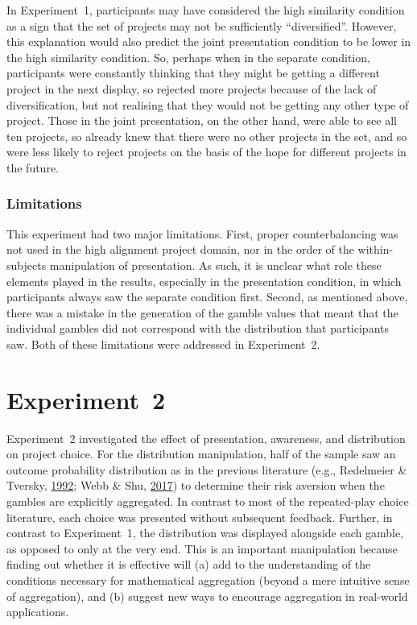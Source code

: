 \documentclass[
  english,
  man, donotrepeattitle,floatsintext]{apa7}
\theoremstyle{definition}
\theoremstyle{definition}
\theoremstyle{definition}
\theoremstyle{definition}
\theoremstyle{remark}
\begin{document}
In Experiment~1, participants may have considered the high similarity condition
as a sign that the set of projects may not be sufficiently ``diversified''.
However, this explanation would also predict the joint presentation condition to
be lower in the high similarity condition. So, perhaps when in the separate
condition, participants were constantly thinking that they might be getting a
different project in the next display, so rejected more projects because of the
lack of diversification, but not realising that they would not be getting any
other type of project. Those in the joint presentation, on the other hand, were
able to see all ten projects, so already knew that there were no other projects
in the set, and so were less likely to reject projects on the basis of the hope
for different projects in the future.

\hypertarget{limitations}{%
\subsubsection{Limitations}\label{limitations}}

This experiment had two major limitations. First, proper counterbalancing was
not used in the high alignment project domain, nor in the order of the
within-subjects manipulation of presentation. As such, it is unclear what role
these elements played in the results, especially in the presentation condition,
in which participants always saw the separate condition first. Second, as
mentioned above, there was a mistake in the generation of the gamble values that
meant that the individual gambles did not correspond with the distribution that
participants saw. Both of these limitations were addressed in Experiment~2.

\hypertarget{aggregation-2}{%
\section{Experiment~2}\label{aggregation-2}}

Experiment~2 investigated the effect of presentation, awareness, and
distribution on project choice. For the distribution manipulation, half of the
sample saw an outcome probability distribution as in the previous literature
(e.g., Redelmeier \& Tversky, \protect\hyperlink{ref-redelmeier1992}{1992}; Webb \& Shu, \protect\hyperlink{ref-webb2017}{2017}) to determine their risk aversion when the
gambles are explicitly aggregated. In contrast to most of the repeated-play
choice literature, each choice was presented without subsequent feedback.
Further, in contrast to Experiment~1, the distribution was displayed alongside
each gamble, as opposed to only at the very end. This is an important
manipulation because finding out whether it is effective will (a) add to the
understanding of the conditions necessary for mathematical aggregation (beyond a
mere intuitive sense of aggregation), and (b) suggest new ways to encourage
aggregation in real-world applications.
\end{document}

